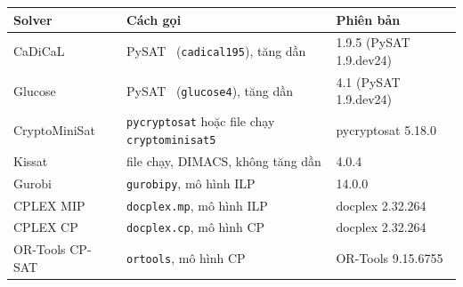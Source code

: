 \begin{tabular}{lll}
\toprule
Solver & Cách gọi & Phiên bản\\
\midrule
CaDiCaL & PySAT~\citep{ignatiev2018} (\texttt{cadical195}), tăng dần & 1.9.5 (PySAT 1.9.dev24)\\
Glucose & PySAT~\citep{ignatiev2018} (\texttt{glucose4}), tăng dần & 4.1 (PySAT 1.9.dev24)\\
CryptoMiniSat & \texttt{pycryptosat} hoặc file chạy \texttt{cryptominisat5} & pycryptosat 5.18.0\\
Kissat & file chạy, DIMACS, không tăng dần & 4.0.4\\
\midrule
Gurobi~\citep{gurobi} & \texttt{gurobipy}, mô hình ILP & 14.0.0\\
CPLEX MIP~\citep{cplex} & \texttt{docplex.mp}, mô hình ILP & docplex 2.32.264\\
CPLEX CP~\citep{cplex} & \texttt{docplex.cp}, mô hình CP & docplex 2.32.264\\
OR-Tools CP-SAT~\citep{cpsat} & \texttt{ortools}, mô hình CP & OR-Tools 9.15.6755\\
\bottomrule
\end{tabular}
